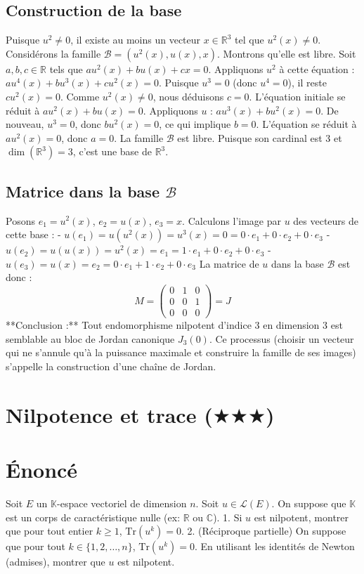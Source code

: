 \documentclass[11pt,a4paper]{article}
\begin{document}
\subsection{Construction de la base}
Puisque $u^2 \neq 0$, il existe au moins un vecteur $x \in \mathbb{R}^3$ tel que $u^2(x) \neq 0$.
Considérons la famille $\mathcal{B} = (u^2(x), u(x), x)$.
Montrons qu'elle est libre.
Soit $a, b, c \in \mathbb{R}$ tels que $a u^2(x) + b u(x) + c x = 0$.
Appliquons $u^2$ à cette équation :
$a u^4(x) + b u^3(x) + c u^2(x) = 0$.
Puisque $u^3 = 0$ (donc $u^4 = 0$), il reste $c u^2(x) = 0$.
Comme $u^2(x) \neq 0$, nous déduisons $c = 0$.
L'équation initiale se réduit à $a u^2(x) + b u(x) = 0$.
Appliquons $u$ :
$a u^3(x) + b u^2(x) = 0$.
De nouveau, $u^3 = 0$, donc $b u^2(x) = 0$, ce qui implique $b = 0$.
L'équation se réduit à $a u^2(x) = 0$, donc $a = 0$.
La famille $\mathcal{B}$ est libre.
Puisque son cardinal est 3 et $\dim(\mathbb{R}^3) = 3$, c'est une base de $\mathbb{R}^3$.

\subsection{Matrice dans la base $\mathcal{B}$}
Posons $e_1 = u^2(x)$, $e_2 = u(x)$, $e_3 = x$.
Calculons l'image par $u$ des vecteurs de cette base :
- $u(e_1) = u(u^2(x)) = u^3(x) = 0 = 0 \cdot e_1 + 0 \cdot e_2 + 0 \cdot e_3$
- $u(e_2) = u(u(x)) = u^2(x) = e_1 = 1 \cdot e_1 + 0 \cdot e_2 + 0 \cdot e_3$
- $u(e_3) = u(x) = e_2 = 0 \cdot e_1 + 1 \cdot e_2 + 0 \cdot e_3$
La matrice de $u$ dans la base $\mathcal{B}$ est donc :
$$M = \begin{pmatrix} 0 & 1 & 0 \\ 0 & 0 & 1 \\ 0 & 0 & 0 \end{pmatrix} = J$$
**Conclusion :** Tout endomorphisme nilpotent d'indice 3 en dimension 3 est semblable au bloc de Jordan canonique $J_3(0)$. Ce processus (choisir un vecteur qui ne s'annule qu'à la puissance maximale et construire la famille de ses images) s'appelle la construction d'une chaîne de Jordan.


\section{Nilpotence et trace ($\bigstar$$\bigstar$$\bigstar$)}

\section{Énoncé}
Soit $E$ un $\mathbb{K}$-espace vectoriel de dimension $n$. Soit $u \in \mathcal{L}(E)$.
On suppose que $\mathbb{K}$ est un corps de caractéristique nulle (ex: $\mathbb{R}$ ou $\mathbb{C}$).
1. Si $u$ est nilpotent, montrer que pour tout entier $k \ge 1$, $\text{Tr}(u^k) = 0$.
2. (Réciproque partielle) On suppose que pour tout $k \in \{1, 2, \dots, n\}$, $\text{Tr}(u^k) = 0$. En utilisant les identités de Newton (admises), montrer que $u$ est nilpotent.
\end{document}
